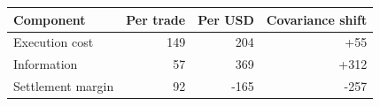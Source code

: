 \begin{tabular}{lrrr}
\toprule
Component & Per trade & Per USD & Covariance shift \\
\midrule
Execution cost & 149 & 204 & +55 \\
Information & 57 & 369 & +312 \\
Settlement margin & 92 & -165 & -257 \\
\bottomrule
\end{tabular}
